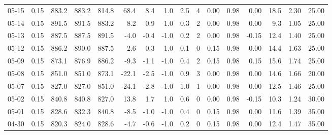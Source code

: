 \begin{threeparttable}
{\begin{tabular}{lrrrrrrrrrrrrrrr}
  05-15 &     0.15 & 883.2 & 883.2 & 814.8 &       68.4 &            8.4 &                      1.0 &                 2.5 &              4 &       0.00 &      0.98 &           0.00 &             18.5 &            2.30 &                  25.00 \\
  05-14 &     0.15 & 891.5 & 891.5 & 883.2 &        8.2 &            0.9 &                      1.0 &                 0.3 &              2 &       0.00 &      0.98 &           0.00 &              9.3 &            1.05 &                  25.00 \\
  05-13 &     0.15 & 887.5 & 887.5 & 891.5 &       -4.0 &           -0.4 &                     -1.0 &                 0.2 &              2 &       0.00 &      0.98 &          -0.15 &             12.4 &            1.40 &                  25.00 \\
  05-12 &     0.15 & 886.2 & 890.0 & 887.5 &        2.6 &            0.3 &                      1.0 &                 0.1 &              0 &       0.15 &      0.98 &           0.00 &             14.4 &            1.63 &                  25.00 \\
  05-09 &     0.15 & 873.1 & 876.9 & 886.2 &       -9.3 &           -1.1 &                     -1.0 &                 0.4 &              2 &       0.15 &      0.98 &           0.15 &             15.6 &            1.74 &                  25.00 \\
  05-08 &     0.15 & 851.0 & 851.0 & 873.1 &      -22.1 &           -2.5 &                     -1.0 &                 0.9 &              3 &       0.00 &      0.98 &           0.00 &             14.6 &            1.66 &                  20.00 \\
  05-07 &     0.15 & 827.0 & 827.0 & 851.0 &      -24.1 &           -2.8 &                     -1.0 &                 1.0 &              1 &       0.00 &      0.98 &           0.00 &             12.5 &            1.46 &                  25.00 \\
  05-02 &     0.15 & 840.8 & 840.8 & 827.0 &       13.8 &            1.7 &                      1.0 &                 0.6 &              0 &       0.00 &      0.98 &          -0.15 &             10.3 &            1.24 &                  30.00 \\
  05-01 &     0.15 & 828.6 & 832.3 & 840.8 &       -8.5 &           -1.0 &                     -1.0 &                 0.4 &              0 &       0.15 &      0.98 &           0.00 &             11.6 &            1.39 &                  35.00 \\
  04-30 &     0.15 & 820.3 & 824.0 & 828.6 &       -4.7 &           -0.6 &                     -1.0 &                 0.2 &              0 &       0.15 &      0.98 &           0.00 &             12.4 &            1.47 &                  35.00 \\

\end{tabular}}
\end{threeparttable}
